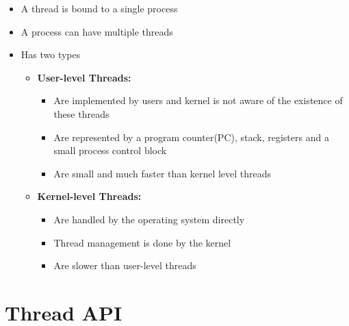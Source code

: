 \documentclass[12pt]{article}
\begin{document}
\begin{itemize}
    \item A thread is bound to a single process
    \item A process can have multiple threads
    \item Has two types
    \begin{itemize}
        \item \textbf{User-level Threads:}

        \begin{itemize}
            \item Are implemented by users and kernel is not aware of the existence of these threads
            \item Are represented by a program counter(PC), stack, registers and a small process control block
            \item Are small and much faster than kernel level threads
        \end{itemize}
        \item \textbf{Kernel-level Threads:}

        \begin{itemize}
            \item Are handled by the operating system directly
            \item Thread management is done by the kernel
            \item Are slower than user-level threads
        \end{itemize}
    \end{itemize}
\end{itemize}

\section{Thread API}
\end{document}
